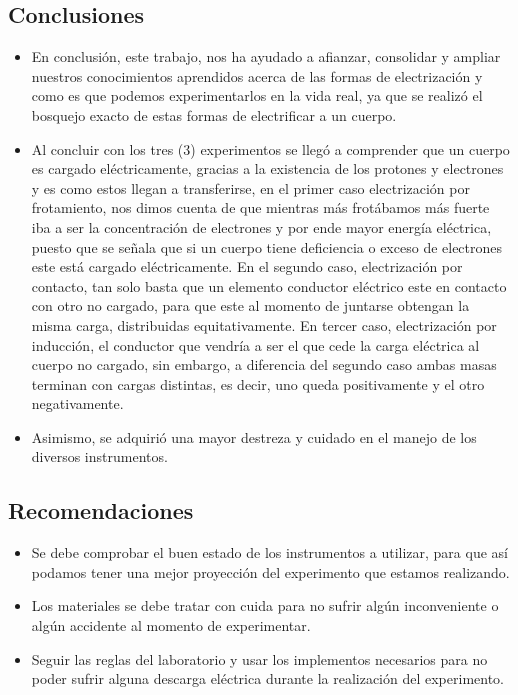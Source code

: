 \subsection{Conclusiones}
\begin{itemize}
	\item En conclusión, este trabajo, nos ha ayudado a afianzar, consolidar y ampliar nuestros conocimientos aprendidos acerca de las formas de electrización y como es que podemos experimentarlos en la vida real, ya que se realizó el bosquejo exacto de estas formas de electrificar a un cuerpo.
	\item Al concluir con los tres (3) experimentos se llegó a comprender que un cuerpo es cargado eléctricamente, gracias a la existencia de los protones y electrones y es como estos llegan a transferirse, en el primer caso electrización por frotamiento, nos dimos cuenta de que mientras más frotábamos más fuerte iba a ser la concentración de electrones y por ende mayor energía eléctrica, puesto que se señala que si un cuerpo tiene deficiencia o exceso de electrones este está cargado eléctricamente. En el segundo caso, electrización por contacto, tan solo basta que un elemento conductor eléctrico este en contacto con otro no cargado, para que este al momento de juntarse obtengan la misma carga, distribuidas equitativamente. En tercer caso, electrización por inducción, el conductor que vendría a ser el que cede la carga eléctrica al cuerpo no cargado, sin embargo, a diferencia del segundo caso ambas masas terminan con cargas distintas, es decir, uno queda positivamente y el otro negativamente.
	\item Asimismo, se adquirió una mayor destreza y cuidado en el manejo de los diversos instrumentos.
\end{itemize}

\subsection{Recomendaciones}
\begin{itemize}
	\item Se debe comprobar el buen estado de los instrumentos a utilizar, para que así podamos tener una mejor proyección del experimento que estamos realizando.
	\item Los materiales se debe tratar con cuida para no sufrir algún inconveniente o algún accidente al momento de experimentar.
	\item Seguir las reglas del laboratorio y usar los implementos necesarios para no poder sufrir alguna descarga eléctrica durante la realización del experimento.
\end{itemize}

